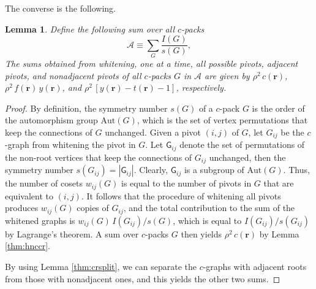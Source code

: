 \documentclass[aip,jcp,reprint,superscriptaddress]{revtex4-1}
\newtheorem{lemm}[thrm]{Lemma}
\newcommand{\vct}[1]{\mathbf{#1}}
\providecommand{\vr}{} %
\renewcommand{\vr}{\vct{r}}
\newcommand{\A}{\mathcal{A}}
\newcommand{\G}{\mathsf{G}}
\newcommand{\Aut}{\mathrm{Aut}}
\begin{document}


The converse is the following.


\begin{lemm}
Define the following sum over all $c$-packs
\begin{equation}
  \A \equiv \sum_G \frac{ I(G) }{ s(G) },
  \label{eq:Adef}
\end{equation}
The sums obtained from whitening,
one at a time,
all possible pivots,
adjacent pivots,
and nonadjacent pivots
of all $c$-packs $G$ in $\A$
are given by
$\rho^2 \, c(\vr)$,
$\rho^2 \, f(\vr) \, y(\vr)$,
and
$\rho^2 \, [y(\vr) - t(\vr) - 1]$,
respectively.
\label{thm:whitenAhnc}
\end{lemm}



\begin{proof}
By definition,
  the symmetry number $s(G)$
  of a $c$-pack $G$
  is the order of the automorphism group $\Aut(G)$,
  which is the set of vertex permutations
  that keep the connections of $G$ unchanged.
%
Given a pivot $(i, j)$ of $G$,
  let $G_{ij}$ be the $c$-graph
  from whitening the pivot in $G$.
%
Let $\G_{ij}$
  denote the set of permutations of the non-root vertices
  that keep the connections of $G_{ij}$ unchanged,
then the symmetry number $s(G_{ij}) = |\G_{ij}|$.
%
Clearly, $\G_{ij}$ is a subgroup of $\Aut(G)$.
%
%
Thus, the number of cosets $w_{ij}(G)$
is equal to the number of pivots in $G$
that are equivalent to $(i, j)$.
%
It follows that the procedure of whitening all pivots
produces $w_{ij}(G)$ copies of $G_{ij}$,
and the total contribution
to the sum of the whitened graphs
is $w_{ij}(G) \, I(G_{ij})/s(G)$,
which is equal to $I(G_{ij})/s(G_{ij})$ by Lagrange's theorem.
%
A sum over $c$-packs $G$
then yields $\rho^2 \, c(\vr)$ by Lemma \ref{thm:hnccr}.

By using Lemma \ref{thm:crsplit},
  we can separate the $c$-graphs with adjacent roots
  from those with nonadjacent ones,
  and this yields the other two sums.
\end{proof}
\end{document}
